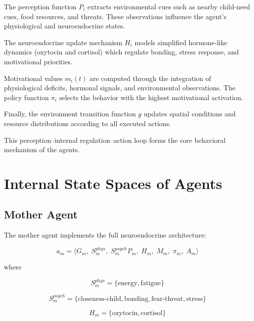 The perception function \(P_i\) extracts environmental cues such as nearby
child-need cues, food resources, and threats. These observations influence
the agent’s physiological and neuroendocrine states.

The neuroendocrine update mechanism \(H_i\) models simplified hormone-like dynamics
(oxytocin and cortisol) which regulate bonding, stress response, and motivational priorities.

Motivational values \(m_i(t)\) are computed through the integration of
physiological deficits, hormonal signals, and environmental observations.
The policy function \(\pi_i\) selects the behavior with the highest
motivational activation.

Finally, the environment transition function \(g\) updates spatial
conditions and resource distributions according to all executed actions.

This perception–internal regulation–action loop forms the core behavioral
mechanism of the agents.















% 



\section{Internal State Spaces of Agents}
\subsection{Mother Agent}

The mother agent implements the full neuroendocrine architecture:

\[
a_m =
\langle
G_m,\;
S_m^{phys},\;
S_m^{psych}
P_m,\;
H_m,\;
M_m,\;
\pi_m,\;
A_m
\rangle
\]

where

\[
S_m^{phys} =
\{\text{energy},\text{fatigue}\}
\]

\[
S_m^{psych} =
\{\text{closeness-child},\text{bonding},\text{fear-threat},\text{stress}\}
\]

\[
H_m =
\{\text{oxytocin},\text{cortisol}\}
\]

